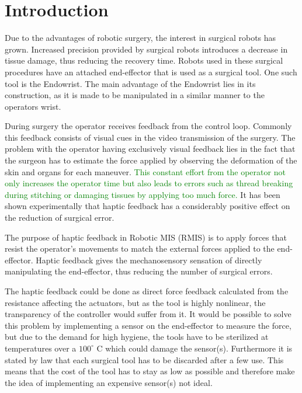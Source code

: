 \section{Introduction}
Due to the advantages of robotic surgery, the interest in surgical robots has grown\cite{forbes}.
Increased precision provided by surgical robots introduces a decrease in tissue damage, thus reducing the recovery time\cite{RIGSP}.
Robots used in these surgical procedures have an attached end-effector that is used as a surgical tool.
One such tool is the Endowrist.
The main advantage of the Endowrist lies in its construction, as it is made to be manipulated in a similar manner to the operators wrist.

During surgery the operator receives feedback from the control loop. Commonly this feedback consists of visual cues in the video transmission of the surgery.
The problem with the operator having exclusively visual feedback lies in the fact that the surgeon has to estimate the force applied by observing the deformation of the skin and organs for each maneuver. \textcolor{green}{This constant effort from the operator not only increases the operator time but also leads to errors such as thread breaking during stitching or damaging tissues by applying too much force.} It has been shown experimentally that haptic feedback has a considerably positive effect on the reduction of surgical error\cite{EOFGFF}.

The purpose of haptic feedback in Robotic MIS (RMIS) is to apply forces that resist the operator’s movements to match the external forces applied to the end-effector.
Haptic feedback gives the mechanosensory sensation of directly manipulating the end-effector, thus reducing the number of surgical errors.

The haptic feedback could be done as direct force feedback calculated from the resistance affecting the actuators, but as the tool is highly nonlinear, the transparency of the controller would suffer from it.  It would be possible to solve this problem by implementing a sensor on the end-effector to measure the force, but due to the demand for high hygiene, the tools have to be sterilized at temperatures over a $100^\circ$ C which could damage the sensor(s). Furthermore it is stated by law that each surgical tool has to be discarded after a few use. This means that the cost of the tool has to stay as low as possible and therefore make the idea of implementing an expensive sensor(s) not ideal.


